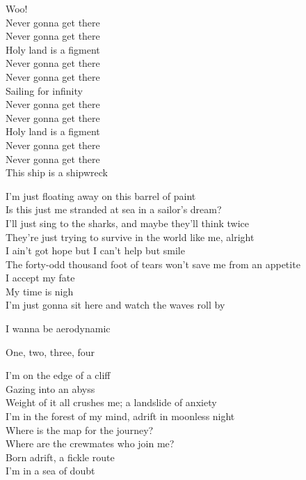 
Woo!\\
Never gonna get there\\
Never gonna get there\\
Holy land is a figment\\
Never gonna get there\\
Never gonna get there\\
Sailing for infinity\\
Never gonna get there\\
Never gonna get there\\
Holy land is a figment\\
Never gonna get there\\
Never gonna get there\\
This ship is a shipwreck\\


I'm just floating away on this barrel of paint\\
Is this just me stranded at sea in a sailor's dream?\\
I'll just sing to the sharks, and maybe they'll think twice\\
They're just trying to survive in the world like me, alright\\
I ain't got hope but I can't help but smile\\
The forty-odd thousand foot of tears won't save me from an appetite\\
I accept my fate\\
My time is nigh\\
I'm just gonna sit here and watch the waves roll by\\


I wanna be aerodynamic\\




One, two, three, four\\


I'm on the edge of a cliff\\
Gazing into an abyss\\
Weight of it all crushes me; a landslide of anxiety\\
I'm in the forest of my mind, adrift in moonless night\\
Where is the map for the journey?\\
Where are the crewmates who join me?\\
Born adrift, a fickle route\\
I'm in a sea of doubt\\

